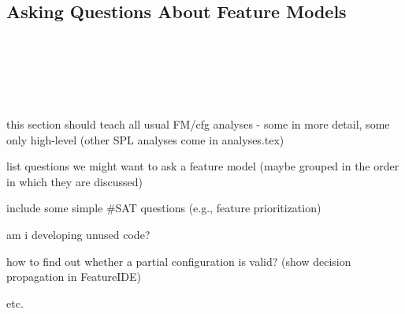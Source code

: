 \subsection{Asking Questions About Feature Models}

\begin{frame}{\myframetitle}
\end{frame}

\begin{frame}{\myframetitle}
\end{frame}

\begin{frame}{\myframetitle}
	~\hfill{}
\end{frame}

\begin{frame}{\myframetitle}
	~\hfill{}
\end{frame}

\begin{frame}{\myframetitle}
	~\hfill{}
\end{frame}

\begin{frame}{\myframetitle}
\end{frame}



\begin{frame}{\myframetitle}
	this section should teach all usual FM/cfg analyses - some in more detail, some only high-level (other SPL analyses come in analyses.tex)

	list questions we might want to ask a feature model (maybe grouped in the order in which they are discussed)

	include some simple \#SAT questions (e.g., feature prioritization)

	am i developing unused code?

	how to find out whether a partial configuration is valid? (show decision propagation in FeatureIDE)

	etc.
\end{frame}

